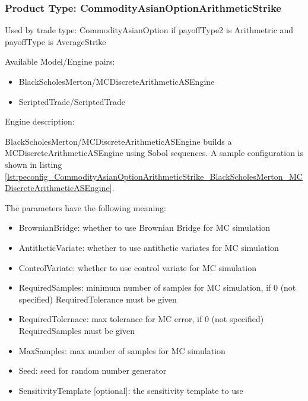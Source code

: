 \subsubsection{Product Type: CommodityAsianOptionArithmeticStrike}

Used by trade type: CommodityAsianOption if payoffType2 is Arithmetric and payoffType is AverageStrike

Available Model/Engine pairs:

\begin{itemize}
\item BlackScholesMerton/MCDiscreteArithmeticASEngine
\item ScriptedTrade/ScriptedTrade
\end{itemize}
  
Engine description:

BlackScholesMerton/MCDiscreteArithmeticASEngine builds a MCDiscreteArithmeticASEngine using Sobol sequences. A sample
configuration is shown in listing
\ref{lst:peconfig_CommodityAsianOptionArithmeticStrike_BlackScholesMerton_MCDiscreteArithmeticASEngine}.

The parameters have the following meaning:

\begin{itemize}
\item BrownianBridge: whether to use Brownian Bridge for MC simulation
\item AntitheticVariate: whether to use antithetic variates for MC simulation
\item ControlVariate: whether to use control variate for MC simulation
\item RequiredSamples: minimum number of samples for MC simulation, if 0 (not specified) RequiredTolerance must be given
\item RequiredTolernace: max tolerance for MC error, if 0 (not specified) RequiredSamples must be given
\item MaxSamples: max number of samples for MC simulation
\item Seed: seed for random number generator
\item SensitivityTemplate [optional]: the sensitivity template to use 
\end{itemize}

